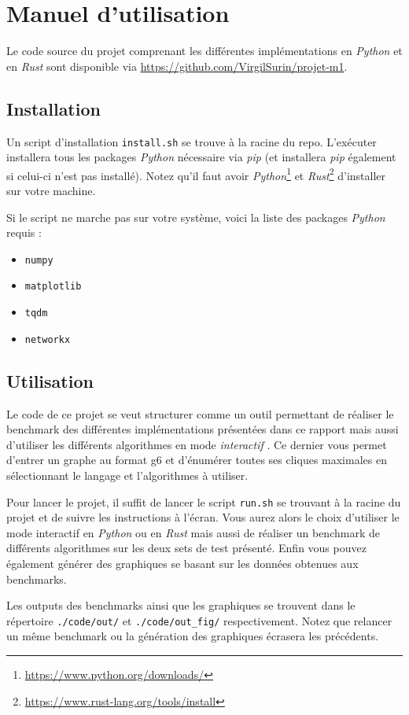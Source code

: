 \documentclass[12pt,a4paper]{article}
\begin{document}
\newpage
\section{Manuel d'utilisation}%
\label{sec:guide}

Le code source du projet comprenant les différentes implémentations en \emph{Python} et en \emph{Rust} sont disponible via \url{https://github.com/VirgilSurin/projet-m1}.

\subsection{Installation}%
\label{subsec:installation}

Un script d'installation \texttt{install.sh} se trouve à la racine du repo. L'exécuter installera tous les packages \emph{Python} nécessaire via \emph{pip} (et installera \emph{pip} également si celui-ci n'est pas installé). Notez qu'il faut avoir \emph{Python}\footnote{\url{https://www.python.org/downloads/}} et \emph{Rust}\footnote{\url{https://www.rust-lang.org/tools/install}} d'installer sur votre machine.

Si le script ne marche pas sur votre système, voici la liste des packages \emph{Python} requis :
\begin{itemize}
  \item \texttt{numpy}
  \item \texttt{matplotlib}
  \item \texttt{tqdm}
  \item \texttt{networkx}
\end{itemize}

\subsection{Utilisation}%
\label{subsec:use}

Le code de ce projet se veut structurer comme un outil permettant de réaliser le benchmark des différentes implémentations présentées dans ce rapport mais aussi d'utiliser les différents algorithmes en mode \og \emph{interactif} \fg{}. Ce dernier vous permet d'entrer un graphe au format g6 et d'énumérer toutes ses cliques maximales en sélectionnant le langage et l'algorithmes à utiliser.

Pour lancer le projet, il suffit de lancer le script \texttt{run.sh} se trouvant à la racine du projet et de suivre les instructions à l'écran. Vous aurez alors le choix d'utiliser le mode interactif en \emph{Python} ou en \emph{Rust} mais aussi de réaliser un benchmark de différents algorithmes sur les deux sets de test présenté. Enfin vous pouvez également générer des graphiques se basant sur les données obtenues aux benchmarks.

Les outputs des benchmarks ainsi que les graphiques se trouvent dans le répertoire \texttt{./code/out/} et \texttt{./code/out\_fig/} respectivement.
Notez que relancer un même benchmark ou la génération des graphiques écrasera les précédents.
\end{document}
